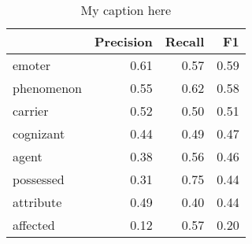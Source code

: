 \begin{table}[!ht]
\centering
\begin{tabular}{lrrr}
\toprule
{} &  Precision &  Recall &   F1 \\
\midrule
emoter     &       0.61 &    0.57 & 0.59 \\
phenomenon &       0.55 &    0.62 & 0.58 \\
carrier    &       0.52 &    0.50 & 0.51 \\
cognizant  &       0.44 &    0.49 & 0.47 \\
agent      &       0.38 &    0.56 & 0.46 \\
possessed  &       0.31 &    0.75 & 0.44 \\
attribute  &       0.49 &    0.40 & 0.44 \\
affected   &       0.12 &    0.57 & 0.20 \\
\bottomrule
\end{tabular}
\caption{My caption here}
\label{tab:PARTICIPANT_ROLE-oe-combined-F1}
\end{table}